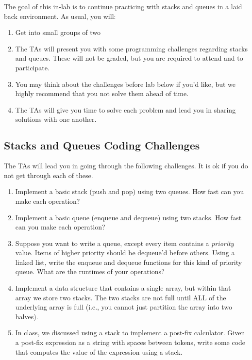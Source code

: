\documentclass[paper=a4, fontsize=11pt, parskip=full]{scrartcl} %
\numberwithin{equation}{section} %
\numberwithin{figure}{section} %
\numberwithin{table}{section} %
\begin{document}
The goal of this in-lab is to continue practicing with stacks and queues in a laid back environment. As usual, you will:

\begin{enumerate}
	\item Get into small groups of two
	\item The TAs will present you with some programming challenges regarding stacks and queues. These will not be graded, but you are required to attend and to participate.
	\item You may think about the challenges before lab below if you'd like, but we highly recommend that you not solve them ahead of time.
	\item The TAs will give you time to solve each problem and lead you in sharing solutions with one another.
\end{enumerate}

\subsection{Stacks and Queues Coding Challenges}

The TAs will lead you in going through the following challenges. It is ok if you do not get through each of these.

\begin{enumerate}
	\item Implement a basic stack (push and pop) using two queues. How fast can you make each operation?
	\item Implement a basic queue (enqueue and dequeue) using two stacks. How fast can you make each operation?
	\item Suppose you want to write a queue, except every item contains a \emph{priority} value. Items of higher priority should be dequeue'd before others. Using a linked list, write the enqueue and dequeue functions for this kind of priority queue. What are the runtimes of your operations?
	\item Implement a data structure that contains a single array, but within that array we store two stacks. The two stacks are not full until ALL of the underlying array is full (i.e., you cannot just partition the array into two halves).
	\item In class, we discussed using a stack to implement a post-fix calculator. Given a post-fix expression as a string with spaces between tokens, write some code that computes the value of the expression using a stack.
\end{enumerate}
\end{document}
